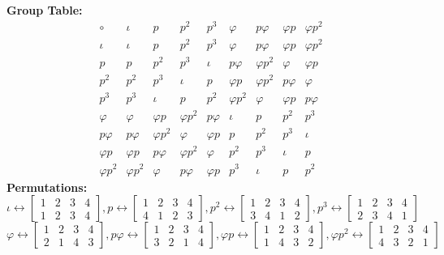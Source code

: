 \textbf{Group Table:}
\[
\begin{array}{c|cccccccc}
\circ 
& \iota & p & p^2 & p^3 & \varphi & p\varphi & \varphi p & \varphi p^2 \\ \hline
\iota 
& \iota & p & p^2 & p^3 & \varphi & p\varphi & \varphi p & \varphi p^2 \\
p 
& p & p^2 & p^3 & \iota & p\varphi & \varphi p^2 & \varphi & \varphi p \\
p^2 
& p^2 & p^3 & \iota & p & \varphi p & \varphi p^2 & p\varphi & \varphi \\
p^3 
& p^3 & \iota & p & p^2 & \varphi p^2 & \varphi & \varphi p & p\varphi \\
\varphi 
& \varphi & \varphi p & \varphi p^2 & p\varphi & \iota & p & p^2 & p^3 \\
p\varphi 
& p\varphi & \varphi p^2 & \varphi & \varphi p & p & p^2 & p^3 & \iota \\
\varphi p 
& \varphi p & p\varphi & \varphi p^2 & \varphi & p^2 & p^3 & \iota & p \\
\varphi p^2 
& \varphi p^2 & \varphi & p\varphi & \varphi p & p^3 & \iota & p & p^2
\end{array}
\]
\textbf{Permutations:}
\[\iota \longleftrightarrow \begin{bmatrix}
    1 & 2 & 3 & 4 \\
    1 & 2 & 3 & 4
\end{bmatrix}, p \longleftrightarrow \begin{bmatrix}
    1 & 2 & 3 & 4 \\
    4 & 1 & 2 & 3
\end{bmatrix}, p^2 \longleftrightarrow \begin{bmatrix}
    1 & 2 & 3 & 4 \\
    3 & 4 & 1 & 2
\end{bmatrix}, p^3 \longleftrightarrow \begin{bmatrix}
    1 & 2 & 3 & 4 \\
    2 & 3 & 4 & 1
\end{bmatrix}\]
\[\varphi \longleftrightarrow \begin{bmatrix}
    1 & 2 & 3 & 4 \\
    2 & 1 & 4 & 3
\end{bmatrix}, p \varphi \longleftrightarrow  \begin{bmatrix}
    1 & 2 & 3 & 4 \\
    3 & 2 & 1 & 4
\end{bmatrix}, \varphi p \longleftrightarrow \begin{bmatrix}
    1 & 2 & 3 & 4 \\
    1 & 4 & 3 & 2
\end{bmatrix}, \varphi p^2 \longleftrightarrow \begin{bmatrix}
    1 & 2 & 3 & 4 \\
    4 & 3 & 2 & 1
\end{bmatrix}\]
